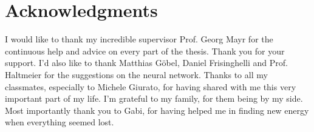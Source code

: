 \chapter*{Acknowledgments}
\thispagestyle{plain}

I would like to thank my incredible supervisor Prof. Georg Mayr for the continuous help and advice on every part of the thesis. Thank you for your support. I'd also like to thank Matthias Göbel, Daniel Frisinghelli and Prof. Haltmeier for the suggestions on the neural network. Thanks to all my classmates, especially to Michele Giurato, for having shared with me this very important part of my life. I'm grateful to my family, for them being by my side. Most importantly thank you to Gabi, for having helped me in finding new energy when everything seemed lost.  